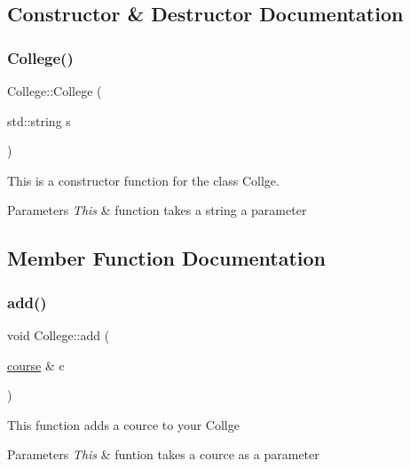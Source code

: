 \subsection{Constructor \& Destructor Documentation}
\mbox{\label{classCollege_adabaf4087355e83f9f7d39f1e1498b41}} 
\subsubsection{\texorpdfstring{College()}{College()}}
{\footnotesize\ttfamily College\+::\+College (\begin{DoxyParamCaption}\item[{std\+::string}]{s }\end{DoxyParamCaption})}

This is a constructor function for the class Collge. 
\begin{DoxyParams}{Parameters}
{\em This} & function takes a string a parameter \\
\hline
\end{DoxyParams}


\subsection{Member Function Documentation}
\mbox{\label{classCollege_a67fd1d8970b46b24ce2e0dd72598a22f}} 
\subsubsection{\texorpdfstring{add()}{add()}}
{\footnotesize\ttfamily void College\+::add (\begin{DoxyParamCaption}\item[{\hyperlink{classcourse}{course} \&}]{c }\end{DoxyParamCaption})}

This function adds a cource to your Collge 
\begin{DoxyParams}{Parameters}
{\em This} & funtion takes a cource as a parameter \\
\hline
\end{DoxyParams}
\mbox{\label{classCollege_af2194c9b37f80d13dc3fdba6784b18e8}} 
